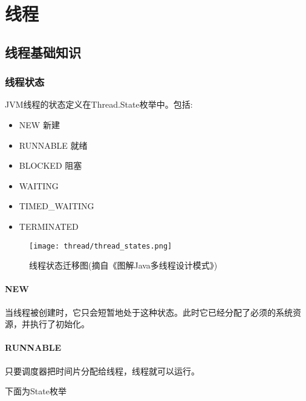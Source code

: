 \chapter{线程}
\label{chap:thread}

\section{线程基础知识}

\subsection{线程状态}

JVM线程的状态定义在Thread.State枚举中。包括:

\begin{itemize}
    \item   NEW         新建
    \item   RUNNABLE    就绪
    \item   BLOCKED     阻塞 
    \item   WAITING     
    \item   TIMED\_WAITING
    \item   TERMINATED
\end{itemize}


\begin{figure}[H]
    \centering
    \texttt{[image: thread/thread\_states.png]}
    \caption{线程状态迁移图(摘自《图解Java多线程设计模式》)}
\end{figure}

\subsubsection{NEW}

当线程被创建时，它只会短暂地处于这种状态。此时它已经分配了必须的系统资源，并执行了初始化。


\subsubsection{RUNNABLE}

只要调度器把时间片分配给线程，线程就可以运行。



下面为State枚举


